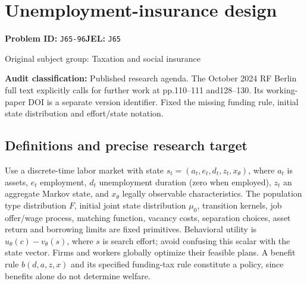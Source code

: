 \documentclass[11pt,a4paper]{article}
\begin{document}
\section*{Unemployment-insurance design}
\textbf{Problem ID:} \texttt{J65-96}\quad \textbf{JEL:} \texttt{J65}\par
\label{problem:OP-0478}
{\sffamily\small\color{muted}Original subject group: Taxation and social insurance\par}
\label{definitions:problem:30007760}
\textbf{Audit classification:} Published research agenda. The October 2024 RF Berlin full text explicitly calls for further work at pp.110–111 and128–130. Its working-paper DOI is a separate version identifier. Fixed the missing funding rule, initial state distribution and effort/state notation.
\subsection*{Definitions and precise research target}
Use a discrete-time labor market with state \(s_t=(a_t,e_t,d_t,z_t,x_\theta)\), where \(a_t\) is assets, \(e_t\) employment, \(d_t\) unemployment duration (zero when employed), \(z_t\) an aggregate Markov state, and \(x_\theta\) legally observable characteristics. The population type distribution \(F\), initial joint state distribution \(\mu_0\), transition kernels, job offer/wage process, matching function, vacancy costs, separation choices, asset return and borrowing limits are fixed primitives. Behavioral utility is \(u_\theta(c)-v_\theta(s)\), where \(s\) is search effort; avoid confusing this scalar with the state vector. Firms and workers globally optimize their feasible plans. A benefit rule \(b(d,a,z,x)\) and its specified funding-tax rule constitute a policy, since benefits alone do not determine welfare.
\end{document}
